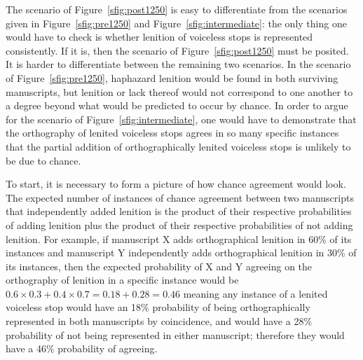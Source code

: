 The scenario of Figure~\ref{sfig:post1250} is easy to differentiate from the scenarios given in Figure~\ref{sfig:pre1250} and Figure~\ref{sfig:intermediate}: the only thing one would have to check is whether lenition of voiceless stops is represented consistently. If it is, then the scenario of Figure~\ref{sfig:post1250} must be posited. It is harder to differentiate between the remaining two scenarios. In the scenario of Figure~\ref{sfig:pre1250}, haphazard lenition would be found in both surviving manuscripts, but lenition or lack thereof would not correspond to one another to a degree beyond what would be predicted to occur by chance. In order to argue for the scenario of Figure~\ref{sfig:intermediate}, one would have to demonstrate that the orthography of lenited voiceless stops agrees in so many specific instances that the partial addition of orthographically lenited voiceless stops is unlikely to be due to chance.


To start, it is necessary to form a picture of how chance agreement would look. The expected number of instances of chance agreement between two manuscripts that independently added lenition is the product of their respective probabilities of adding lenition plus the product of their respective probabilities of not adding lenition. For example, if manuscript X adds orthographical lenition in 60\% of its instances and manuscript Y independently adds orthographical lenition in 30\% of its instances, then the expected probability of X and Y agreeing on the orthography of lenition in a specific instance would be
\(0.6 \times 0.3 + 0.4 \times 0.7= 0.18 + 0.28 = 0.46\)
meaning any instance of a lenited voiceless stop would have an 18\% probability of being orthographically represented in both manuscripts by coincidence, and would have a 28\% probability of not being represented in either manuscript; therefore they would  have a 46\% probability of agreeing. 

